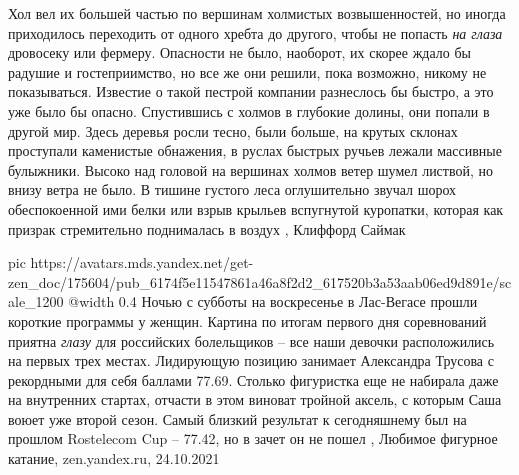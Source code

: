 Хол вел их большей частью по вершинам холмистых возвышенностей, но иногда
приходилось переходить от одного хребта до другого, чтобы не попасть \emph{на
глаза} дровосеку или фермеру. Опасности не было, наоборот, их скорее ждало бы
радушие и гостеприимство, но все же они решили, пока возможно, никому не
показываться.  Известие о такой пестрой компании разнеслось бы быстро, а это
уже было бы опасно.  Спустившись с холмов в глубокие долины, они попали в
другой мир. Здесь деревья росли тесно, были больше, на крутых склонах
проступали каменистые обнажения, в руслах быстрых ручьев лежали массивные
булыжники. Высоко над головой на вершинах холмов ветер шумел листвой, но внизу
ветра не было. В тишине густого леса оглушительно звучал шорох обеспокоенной
ими белки или взрыв крыльев вспугнутой куропатки, которая как призрак
стремительно поднималась в воздух
, Клиффорд Саймак

\ifcmt
  pic https://avatars.mds.yandex.net/get-zen_doc/175604/pub_6174f5e11547861a46a8f2d2_617520b3a53aab06ed9d891e/scale_1200
  @width 0.4
\fi
Ночью с субботы на воскресенье в Лас-Вегасе прошли короткие программы у женщин.
Картина по итогам первого дня соревнований приятна \emph{глазу} для российских
болельщиков – все наши девочки расположились на первых трех местах.
Лидирующую позицию занимает Александра Трусова с рекордными для себя баллами
77.69. Столько фигуристка еще не набирала даже на внутренних стартах, отчасти в
этом виноват тройной аксель, с которым Саша воюет уже второй сезон. Самый
близкий результат к сегодняшнему был на прошлом Rostelecom Cup – 77.42, но в
зачет он не пошел
, 
Любимое фигурное катание, zen.yandex.ru, 24.10.2021
